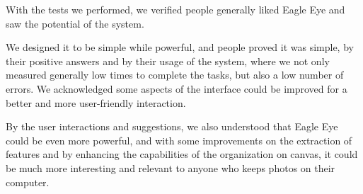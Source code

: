 With the tests we performed, we verified people generally liked Eagle Eye and saw the potential of the system.

We designed it to be simple while powerful, and people proved it was simple, by their positive answers and by their usage of the system, where we not only measured generally low times to complete the tasks, but also a low number of errors. We acknowledged some aspects of the interface could be improved for a better and more user-friendly interaction.

By the user interactions and suggestions, we also understood that Eagle Eye could be even more powerful, and with some improvements on the extraction of features and by enhancing the capabilities of the organization on canvas, it could be much more interesting and relevant to anyone who keeps photos on their computer.
